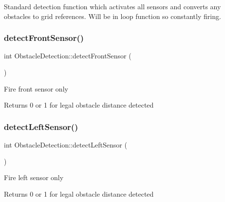 Standard detection function which activates all sensors and converts any obstacles to grid references. Will be in loop function so constantly firing. \mbox{\label{class_obstacle_detection_a617610d3df5438e409bb810a53e61772}} 
\subsubsection{\texorpdfstring{detect\+Front\+Sensor()}{detectFrontSensor()}}
{\footnotesize\ttfamily int Obstacle\+Detection\+::detect\+Front\+Sensor (\begin{DoxyParamCaption}{ }\end{DoxyParamCaption})\hspace{0.3cm}{\ttfamily [private]}}

Fire front sensor only \begin{DoxyReturn}{Returns}
0 or 1 for legal obstacle distance detected 
\end{DoxyReturn}
\mbox{\label{class_obstacle_detection_ab79f1c269cb0c4e033a3485309f870e4}} 
\subsubsection{\texorpdfstring{detect\+Left\+Sensor()}{detectLeftSensor()}}
{\footnotesize\ttfamily int Obstacle\+Detection\+::detect\+Left\+Sensor (\begin{DoxyParamCaption}{ }\end{DoxyParamCaption})\hspace{0.3cm}{\ttfamily [private]}}

Fire left sensor only \begin{DoxyReturn}{Returns}
0 or 1 for legal obstacle distance detected 
\end{DoxyReturn}
\mbox{\label{class_obstacle_detection_ab9d63d29923dfd52061f456afc403e45}} 
